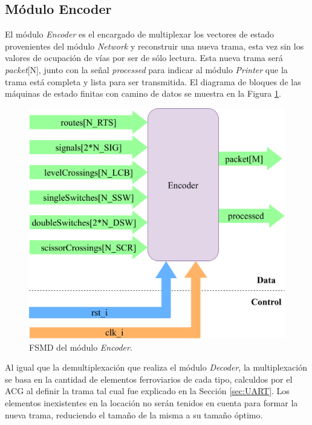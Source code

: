 \subsection{Módulo Encoder}

El módulo \textit{Encoder} es el encargado de multiplexar los vectores de estado provenientes del módulo \textit{Network} y reconstruir una nueva trama, esta vez sin los valores de ocupación de vías por ser de sólo lectura. Esta nueva trama será \textit{packet}[N], junto con la señal \textit{processed} para indicar al módulo \textit{Printer} que la trama está completa y lista para ser transmitida. El diagrama de bloques de las máquinas de estado finitas con camino de datos se muestra en la Figura \ref{fig:Encoder_module}.

\begin{figure}[H]
	\centering
	\includegraphics[width=1\textwidth]{Figuras/Encoder_module.png}
	\centering\caption{FSMD del módulo \textit{Encoder}.}
	\label{fig:Encoder_module}
\end{figure}

Al igual que la demultiplexación que realiza el módulo \textit{Decoder}, la multiplexación se basa en la cantidad de elementos ferroviarios de cada tipo, calculdos por el ACG al definir la trama tal cual fue explicado en la Sección \ref{sec:UART}. Los elementos inexistentes en la locación no serán tenidos en cuenta para formar la nueva trama, reduciendo el tamaño de la misma a su tamaño óptimo.